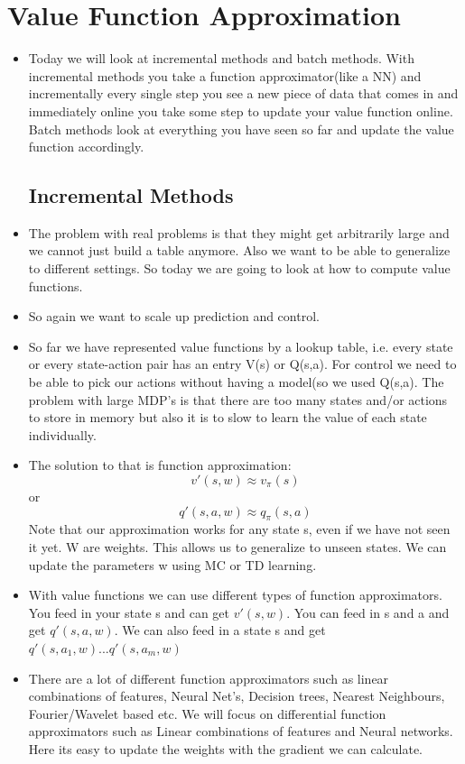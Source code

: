 \documentclass[a4paper]{article}
\begin{document}
\section{Value Function Approximation}
\begin{itemize}
    \item Today we will look at incremental methods and batch methods. With incremental methods you take a function approximator(like a NN) and incrementally every single step you see a new piece of data that comes in and immediately online you take some step to update your value function online. Batch methods look at everything you have seen so far and update the value function accordingly. 
\subsection{Incremental Methods}
    \item The problem with real problems is that they might get arbitrarily large and we cannot just build a table anymore. Also we want to be able to generalize to different settings. So today we are going to look at how to compute value functions. 
    \item So again we want to scale up prediction and control. 
    \item So far we have represented value functions by a lookup table, i.e. every state or every state-action pair has an entry V(s) or Q(s,a). For control we need to be able to pick our actions without having a model(so we used Q(s,a). The problem with large MDP's is that there are too many states and/or actions to store in memory but also it is to slow to learn the value of each state individually.
    \item The solution to that is function approximation: 
    $$v'(s,w) \approx v_{\pi}(s) $$ or $$ q'(s,a,w) \approx q_{\pi}(s,a)$$ Note that our approximation works for any state s, even if we have not seen it yet. W are weights. This allows us to generalize to unseen states. We can update the parameters w using MC or TD learning. \item With value functions we can use different types of function approximators. You feed in your state s and can get $v'(s,w)$. You can feed in s and a and get $q'(s,a,w)$. We can also feed in a state s and get $q'(s,a_1,w)...q'(s,a_m,w)$
    \item There are a lot of different function approximators such as linear combinations of features, Neural Net's, Decision trees, Nearest Neighbours, Fourier/Wavelet based etc. We will focus on differential function approximators such as Linear combinations of features and Neural networks. Here its easy to update the weights with the gradient we can calculate. 

\end{itemize}
\end{document}
